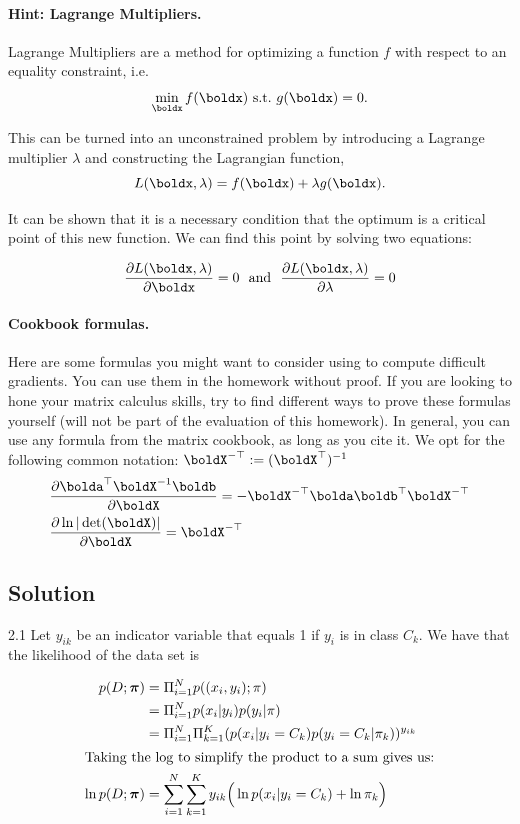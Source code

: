 \documentclass[submit]{harvardml}
\begin{document}
\begin{problem}
\paragraph{Hint: Lagrange Multipliers.} Lagrange Multipliers are a method for
optimizing a function $f$ with respect to an
equality constraint, i.e.
\[\min_{\boldx} f(\boldx)\ \text{s.t.}\ g(\boldx) = 0.\]

This can be turned into an unconstrained problem by introducing a
Lagrange multiplier $\lambda$ and constructing the Lagrangian function,
\[L(\boldx, \lambda) =  f(\boldx) + \lambda g(\boldx).\]

It can be shown that it is a necessary condition that the optimum
is a critical point of this new function. We can find this point by solving two equations:

\[\frac{\partial L(\boldx, \lambda)}{\partial  \boldx} = 0  \ \ \text{and}\  \  \frac{\partial L(\boldx, \lambda)}{\partial \lambda} = 0 \]


\paragraph{Cookbook formulas.} Here are some formulas you might want to consider
using to compute difficult gradients. You can use them  in the homework
without proof. If you are looking to hone your matrix calculus skills, try to
find different ways to prove these formulas yourself (will not be part of the
evaluation of this homework). In general, you can use any formula from the matrix cookbook,
as long as you cite it. We opt for the following common notation:
$\boldX^{-\top} := (\boldX^{\top})^{-1}$
\begin{align*}
  & \frac{\partial \bolda^\top \boldX^{-1} \boldb}{\partial \boldX} = - \boldX^{-\top} \bolda \boldb^\top \boldX^{-\top} \\
  & \frac{\partial \ln | \det (\boldX) |}{\partial \boldX} = \boldX^{-\top}
 \end{align*}
 \end{problem}


\subsection*{Solution}

2.1 Let $y_{ik}$ be an indicator variable that equals 1 if $y_{i}$ is in class $C_{k}$. We have that the likelihood of the data set is 

\begin{align*}
    p(D; \boldsymbol{\pi}) &= \Pi_{i=1}^N p((x_i, y_i);\pi)\\
    &= \Pi_{i=1}^N p(x_i|y_i) p(y_i|\pi)\\
    &=  \Pi_{i=1}^N \Pi_{k=1}^K (p(x_{i}|y_{i}=C_k) p(y_i=C_k|\pi_k))^{y_{ik}}\\
    \intertext{Taking the log to simplify the product to a sum gives us:}
    \ln{p(D; \boldsymbol{\pi})} &=  \sum_{i=1}^N \sum_{k=1}^K y_{ik} \Big(\ln{p(x_{i}|y_i=C_k)} + \ln{\pi_k}\Big)
\end{align*}
\end{document}
